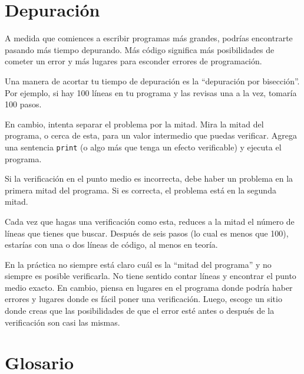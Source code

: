 \documentclass[10pt]{book}
\begin{document}
\section{Depuración}
\label{bisectbug}

A medida que comiences a escribir programas más grandes, podrías encontrarte
pasando más tiempo depurando.  Más código significa más posibilidades de
cometer un error y más lugares para esconder errores de programación.

Una manera de acortar tu tiempo de depuración es la ``depuración por bisección''.
Por ejemplo, si hay 100 líneas en tu programa y las
revisas una a la vez, tomaría 100 pasos.

En cambio, intenta separar el problema por la mitad.  Mira la mitad
del programa, o cerca de esta, para un valor intermedio que
puedas verificar.  Agrega una sentencia {\tt print} (o algo más
que tenga un efecto verificable) y ejecuta el programa.

Si la verificación en el punto medio es incorrecta, debe haber un problema en la
primera mitad del programa.  Si es correcta, el problema está
en la segunda mitad.

Cada vez que hagas una verificación como esta, reduces a la mitad el número
de líneas que tienes que buscar.  Después de seis pasos (lo cual es menos que 100),
estarías con una o dos líneas de código, al menos en teoría.

En la práctica no siempre está claro cuál es
la ``mitad del programa'' y no siempre es posible
verificarla.  No tiene sentido contar líneas y encontrar el
punto medio exacto.  En cambio, piensa en lugares
en el programa donde podría haber errores y lugares donde es
fácil poner una verificación.  Luego, escoge un sitio donde
creas que las posibilidades de que el error esté antes o después
de la verificación son casi las mismas.




\section{Glosario}
\end{document}
